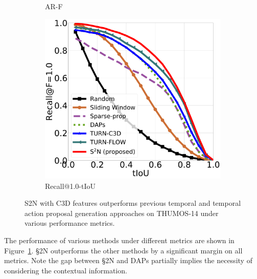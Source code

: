 \documentclass[10pt,journal,compsoc]{IEEEtran}
\begin{document}
\begin{figure}[t]
\begin{subfigure}[b]{0.32\textwidth}
        \caption{AR-F}
   \end{subfigure}  
       \begin{subfigure}[b]{0.32\textwidth}
   	\includegraphics[width=\textwidth]{figures/results/Ours_recall_freq_pub.pdf}
    \caption{Recall@1.0-tIoU}
       \end{subfigure}  

   \caption{S2N with C3D features outperforms previous temporal and temporal action proposal generation approaches on THUMOS-14 under various performance metrics. \label{fig:proposal-c3d}}   
\vspace{-.05in}
\end{figure}


 The performance of various methods under different metrics are shown in Figure~\ref{fig:proposal-c3d}. \S2N outperforms the other methods by a significant margin on all metrics. Note the gap between \S2N and DAPs partially implies the necessity of considering the contextual information. 
\end{document}
